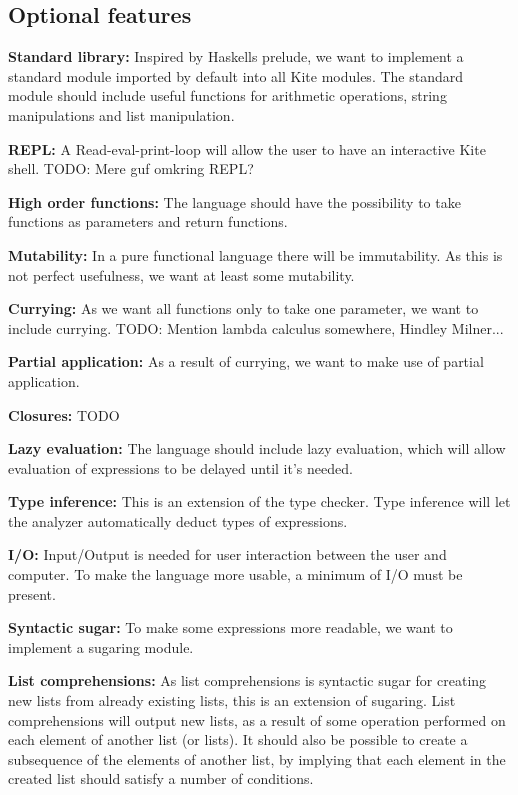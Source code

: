\subsection{Optional features}

\textbf{Standard library:} Inspired by Haskells prelude, we want to
implement a standard module imported by default into all Kite
modules. The standard module should include useful functions for
arithmetic operations, string manipulations and list manipulation.

\textbf{REPL:} A Read-eval-print-loop will allow the user to have an
interactive Kite shell. TODO: Mere guf omkring REPL?

\textbf{High order functions:} The language should have the
possibility to take functions as parameters and return functions.

\textbf{Mutability:} In a pure functional language there will be
immutability. As this is not perfect usefulness, we want at least some
mutability.

\textbf{Currying:} As we want all functions only to take one
parameter, we want to include currying. TODO: Mention lambda calculus
somewhere, Hindley Milner...

\textbf{Partial application:} As a result of currying, we want to make
use of partial application.

\textbf{Closures:} TODO

\textbf{Lazy evaluation:} The language should include lazy evaluation,
which will allow evaluation of expressions to be delayed until it's needed.

\textbf{Type inference:} This is an extension of the type
checker. Type inference will let the analyzer automatically deduct
types of expressions. 

\textbf{I/O:} Input/Output is needed for user interaction between the
user and computer. To make the language more usable, a minimum of I/O
must be present.

\textbf{Syntactic sugar:} To make some expressions more readable, we want to
implement a sugaring module.

\textbf{List comprehensions:} As list comprehensions is syntactic
sugar for creating new lists from already existing lists, this is an
extension of sugaring. List comprehensions will output new lists, as a
result of some operation performed on each element of another list (or
lists). It should also be possible to create a subsequence of the
elements of another list, by implying that each element in the created
list should satisfy a number of conditions.

